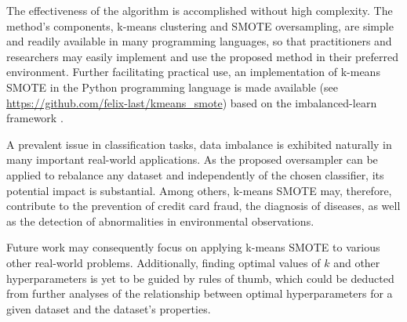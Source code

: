 \documentclass[sort&compress]{elsarticle}
\begin{document}
The effectiveness of the algorithm is accomplished without high complexity. The
method's components, k-means clustering and \ac{SMOTE} oversampling, are simple
and readily available in many programming languages, so that practitioners and
researchers may easily implement and use the proposed method in their preferred
environment. Further facilitating practical use, an implementation of k-means
\ac{SMOTE} in the Python programming language is made available (see
\url{https://github.com/felix-last/kmeans_smote}) based on the imbalanced-learn
framework \citep{Lemaitre.2017}.

A prevalent issue in classification tasks, data imbalance is exhibited naturally
in many important real-world applications. As the proposed oversampler can be
applied to rebalance any dataset and independently of the chosen classifier, its
potential impact is substantial. Among others, k-means \ac{SMOTE} may,
therefore, contribute to the prevention of credit card fraud, the diagnosis of
diseases, as well as the detection of abnormalities in environmental
observations.

Future work may consequently focus on applying k-means \ac{SMOTE} to various
other real-world problems. Additionally, finding optimal values of $k$ and other
hyperparameters is yet to be guided by rules of thumb, which could be deducted
from further analyses of the relationship between optimal hyperparameters for a
given dataset and the dataset's properties.



\end{document}
